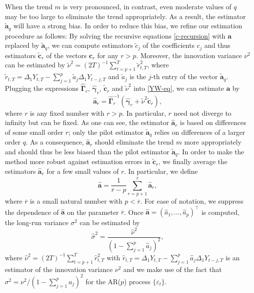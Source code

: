 When the trend $m$ is very pronounced, in contrast, even moderate values of $q$ may be too large to eliminate the trend appropriately. As a result, the estimator $\widetilde{\boldsymbol{a}}_q$ will have a strong bias. In order to reduce this bias, we refine our estimation procedure as follows: By solving the recursive equations \eqref{c-recursion} with $\boldsymbol{a}$ replaced by $\widetilde{\boldsymbol{a}}_q$, we can compute estimators $\widetilde{c}_j$ of the coefficients $c_j$ and thus estimators $\widetilde{\boldsymbol{c}}_r$ of the vectors $\boldsymbol{c}_r$ for any $r > p$. Moreover, the innovation variance $\nu^2$ can be estimated by $\widetilde{\nu}^2 = (2T)^{-1} \sum_{t=p+1}^T \widetilde{r}_{t,T}^2$, where $\widetilde{r}_{t,T} = \Delta_1 Y_{t,T} - \sum_{j=1}^p \widetilde{a}_j \Delta_1 Y_{t-j,T}$ and $\widetilde{a}_j$ is the $j$-th entry of the vector $\widetilde{\boldsymbol{a}}_q$. Plugging the expressions $\widehat{\boldsymbol{\Gamma}}_r$, $\widehat{\boldsymbol{\gamma}}_r$, $\widetilde{\boldsymbol{c}}_r$ and $\widetilde{\nu}^2$ into \eqref{YW-eq}, we can estimate $\boldsymbol{a}$ by 
\begin{equation}\label{est-AR-SS} 
\widehat{\boldsymbol{a}}_r = \widehat{\boldsymbol{\Gamma}}_r^{-1} (\widehat{\boldsymbol{\gamma}}_r + \widetilde{\nu}^2 \widetilde{\boldsymbol{c}}_r),
\end{equation} 
where $r$ is any fixed number with $r > p$. In particular, $r$ need not diverge to infinity but can be fixed. As one can see, the estimator $\widehat{\boldsymbol{a}}_r$ is based on differences of some small order $r$; only the pilot estimator $\widetilde{\boldsymbol{a}}_q$ relies on differences of a larger order $q$. As a consequence, $\widehat{\boldsymbol{a}}_r$ should eliminate the trend $m$ more appropriately and should thus be less biased than the pilot estimator $\widetilde{\boldsymbol{a}}_q$. In order to make the method more robust against estimation errors in $\widetilde{\boldsymbol{c}}_r$, we finally average the estimators $\widehat{\boldsymbol{a}}_r$ for a few small values of $r$. In particular, we define  
\begin{equation}\label{est-AR}
\widehat{\boldsymbol{a}} = \frac{1}{\overline{r}-p} \sum\limits_{r=p+1}^{\overline{r}} \widehat{\boldsymbol{a}}_r, 
\end{equation}
where $\overline{r}$ is a small natural number with $p < \overline{r}$. For ease of notation, we suppress the dependence of $\widehat{\boldsymbol{a}}$ on the parameter $\overline{r}$. Once $\widehat{\boldsymbol{a}} =(\widehat{a}_1,\ldots,\widehat{a}_p)^\top$ is computed, the long-run variance $\sigma^2$ can be estimated by 
\begin{equation} \label{est-lrv}
\widehat{\sigma}^2 = \frac{\widehat{\nu}^2}{(1 - \sum_{j=1}^p \widehat{a}_j)^2}, 
\end{equation}
where $\widehat{\nu}^2 = (2T)^{-1} \sum_{t=p+1}^T \widehat{r}_{t,T}^2$ with $\widehat{r}_{t,T} = \Delta_1 Y_{t,T} - \sum_{j=1}^p \widehat{a}_j \Delta_1 Y_{t-j,T}$ is an estimator of the innovation variance $\nu^2$ and we make use of the fact that $\sigma^2 = \nu^2 / (1 - \sum_{j=1}^p a_j)^2$ for the AR($p$) process $\{\varepsilon_t\}$. 


